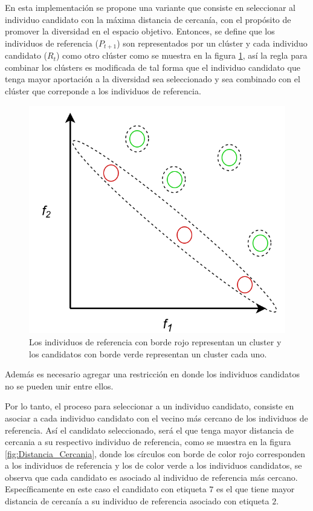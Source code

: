 En esta implementación se propone una variante que consiste en seleccionar al individuo candidato con la máxima distancia de cercanía, con el propósito de promover la diversidad en el espacio objetivo.
%
Entonces, se define que los individuos de referencia ($P_{t+1}$) son representados por un clúster y cada individuo candidato ($R_t$) como otro clúster como se muestra en la figura \ref{fig:Clusters}, así la regla para combinar los clústers es modificada de tal forma que el individuo candidato que tenga mayor aportación a la diversidad sea seleccionado y sea combinado con el clúster que correponde a los individuos de referencia.
\begin{figure}[H]
\centering
\scriptsize
\includegraphics[scale=0.2]
{Figures_Chapter3/Cluster.png}
\decoRule
\caption{Los individuos de referencia con borde rojo representan un cluster y los candidatos con borde verde representan un cluster cada uno.}
\label{fig:Clusters}
\end{figure}

%
Además es necesario agregar una restricción en donde los individuos candidatos no se pueden unir entre ellos.

%
Por lo tanto, el proceso para seleccionar a un individuo candidato, consiste en asociar a cada individuo candidato con el vecino más cercano de los individuos de referencia.
%
Así el candidato seleccionado, será el que tenga mayor distancia de cercania a su respectivo individuo de referencia, como se muestra en la figura \ref{fig:Distancia_Cercania}, donde los círculos con borde de color rojo corresponden a los individuos de referencia y los de color verde a los individuos candidatos, se observa que cada candidato es asociado al individuo de referencia más cercano.
%
Específicamente en este caso el candidato con etiqueta $7$ es el que tiene mayor distancia de cercanía a su individuo de referencia asociado con etiqueta $2$.
%

